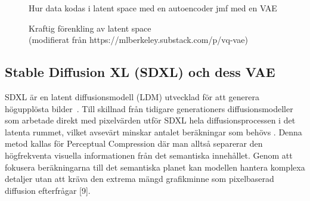 \begin{figure}[htbp]
  \centering
  \resizebox{0.7\textwidth}{!}{}
  \caption{Hur data kodas i latent space med en autoencoder jmf med en VAE}
  \label{fig:latent-space}
\end{figure}


\begin{figure}[htbp]
  \centering
  \resizebox{0.75\textwidth}{!}{}
  \caption{Kraftig förenkling av latent space \\(modifierat från https://mlberkeley.substack.com/p/vq-vae)}
  \label{fig:latent-space}
\end{figure}


\subsection*{Stable Diffusion XL (SDXL) och dess VAE}
SDXL är en latent diffusionsmodell (LDM) utvecklad för att generera högupplösta bilder~\cite{podell2024sdxl}. Till skillnad från tidigare generationers diffusionsmodeller som arbetade direkt med pixelvärden utför SDXL hela diffusionsprocessen i det latenta rummet, vilket avsevärt minskar antalet beräkningar som behövs \cite{rombach2022highresolution, podell2024sdxl, ricker2024aeroblade}. Denna metod kallas för Perceptual Compression där man alltså separerar den högfrekventa visuella informationen från det semantiska innehållet. Genom att fokusera beräkningarna till det semantiska planet kan modellen hantera komplexa detaljer utan att kräva den extrema mängd grafikminne som pixelbaserad diffusion efterfrågar [9].


